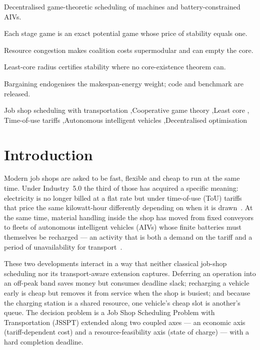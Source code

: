 \documentclass[preprint, 3p, review, 12pt]{elsarticle}
\theoremstyle{definition}
\begin{document}
\begin{frontmatter}
\begin{highlights}
\item Decentralised game-theoretic scheduling of machines and battery-constrained AIVs.
\item Each stage game is an exact potential game whose price of stability equals one.
\item Resource congestion makes coalition costs supermodular and can empty the core.
\item Least-core radius certifies stability where no core-existence theorem can.
\item Bargaining endogenises the makespan-energy weight; code and benchmark are released.
\end{highlights}

\begin{keyword}
Job shop scheduling with transportation \sep Cooperative game theory \sep Least core \sep
Time-of-use tariffs \sep Autonomous intelligent vehicles \sep Decentralised optimisation
\end{keyword}

\end{frontmatter}

\section{Introduction}
\label{sec:intro}

Modern job shops are asked to be fast, flexible and cheap to run at the same time. Under
Industry~5.0 the third of those has acquired a specific meaning: electricity is no longer
billed at a flat rate but under time-of-use (ToU) tariffs that price the same kilowatt-hour
differently depending on when it is drawn~\citep{7349258, su16062443}. At the same time,
material handling inside the shop has moved from fixed conveyors to fleets of autonomous
intelligent vehicles (AIVs) whose finite batteries must themselves be recharged --- an
activity that is both a demand on the tariff and a period of unavailability for
transport~\citep{DESTOUET2023155, en13184948}.

These two developments interact in a way that neither classical job-shop scheduling nor its
transport-aware extension captures. Deferring an operation into an off-peak band saves money
but consumes deadline slack; recharging a vehicle early is cheap but removes it from service
when the shop is busiest; and because the charging station is a shared resource, one
vehicle's cheap slot is another's queue. The decision problem is a Job Shop Scheduling
Problem with Transportation (JSSPT) extended along two coupled axes --- an economic axis
(tariff-dependent cost) and a resource-feasibility axis (state of charge) --- with a hard
completion deadline.
\end{document}
